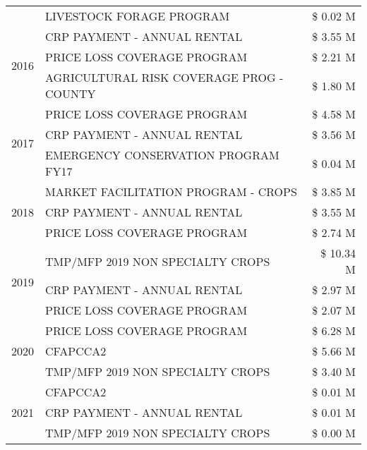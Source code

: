 \begin{tabular}{llr}
 & LIVESTOCK FORAGE PROGRAM & \$ 0.02 M \\
\cline{1-3}
\multirow[t]{3}{*}{2016} & CRP PAYMENT - ANNUAL RENTAL & \$ 3.55 M \\
 & PRICE LOSS COVERAGE PROGRAM & \$ 2.21 M \\
 & AGRICULTURAL RISK COVERAGE PROG - COUNTY & \$ 1.80 M \\
\cline{1-3}
\multirow[t]{3}{*}{2017} & PRICE LOSS COVERAGE PROGRAM & \$ 4.58 M \\
 & CRP PAYMENT - ANNUAL RENTAL & \$ 3.56 M \\
 & EMERGENCY CONSERVATION PROGRAM FY17 & \$ 0.04 M \\
\cline{1-3}
\multirow[t]{3}{*}{2018} & MARKET FACILITATION PROGRAM - CROPS & \$ 3.85 M \\
 & CRP PAYMENT - ANNUAL RENTAL & \$ 3.55 M \\
 & PRICE LOSS COVERAGE PROGRAM & \$ 2.74 M \\
\cline{1-3}
\multirow[t]{3}{*}{2019} & TMP/MFP 2019 NON SPECIALTY CROPS & \$ 10.34 M \\
 & CRP PAYMENT - ANNUAL RENTAL & \$ 2.97 M \\
 & PRICE LOSS COVERAGE PROGRAM & \$ 2.07 M \\
\cline{1-3}
\multirow[t]{3}{*}{2020} & PRICE LOSS COVERAGE PROGRAM & \$ 6.28 M \\
 & CFAPCCA2 & \$ 5.66 M \\
 & TMP/MFP 2019 NON SPECIALTY CROPS & \$ 3.40 M \\
\cline{1-3}
\multirow[t]{3}{*}{2021} & CFAPCCA2 & \$ 0.01 M \\
 & CRP PAYMENT - ANNUAL RENTAL & \$ 0.01 M \\
 & TMP/MFP 2019 NON SPECIALTY CROPS & \$ 0.00 M \\
\cline{1-3}
\bottomrule
\end{tabular}
